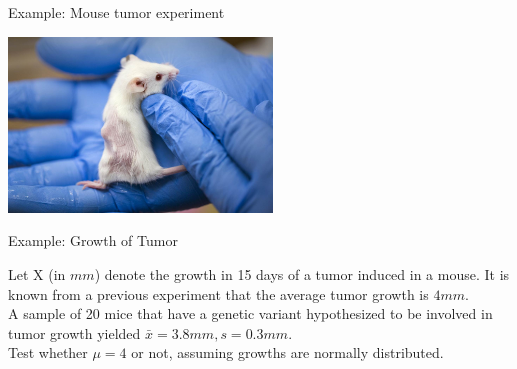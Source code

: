 \documentclass{beamer}\usepackage[]{graphicx}\usepackage[]{color}
\begin{document}
\begin{frame}{Example: Mouse tumor experiment}

\begin{center}
\includegraphics[width=7cm,height=5.3 cm]{mouse-tumor.jpg}
\end{center}

\end{frame}


\begin{frame}{Example: Growth of Tumor}

    Let X (in $mm$) denote the growth in 15 days of a tumor induced in
    a mouse. It is known from a previous experiment that the average
    tumor growth is $4mm$.\\ \pause
\bigskip
    A sample of 20 mice that have a genetic
    variant hypothesized to be involved in tumor growth yielded
    $\bar{x} = 3.8mm, s = 0.3mm$.\\ \pause
\bigskip
    Test whether $\mu = 4$ or not,
    assuming growths are normally distributed.

\end{frame}
\end{document}
